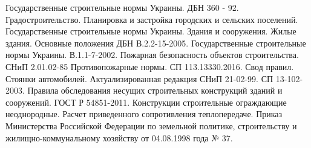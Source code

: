 \begin{thebibliography}{9}
Государственные строительные нормы Украины. ДБН 360 - 92. Градостроительство. Планировка и застройка городских и сельских поселений.  
Государственные строительные нормы Украины. Здания и сооружения. Жилые здания. Основные положения ДБН В.2.2-15-2005.  
Государственные строительные нормы Украины. В.1.1-7-2002. Пожарная безопасность объектов строительства.  
СНиП 2.01.02-85 Противопожарные нормы.  
СП 113.13330.2016. Свод правил. Стоянки автомобилей. Актуализированная редакция СНиП 21-02-99.  
СП 13-102-2003. Правила обследования несущих строительных конструкций зданий и сооружений.  
ГОСТ Р 54851-2011. Конструкции строительные ограждающие неоднородные. Расчет приведенного сопротивления теплопередаче.  
Приказ Министерства Российской Федерации по земельной политике, строительству и жилищно-коммунальному хозяйству от 04.08.1998 года № 37.  
\end{thebibliography}